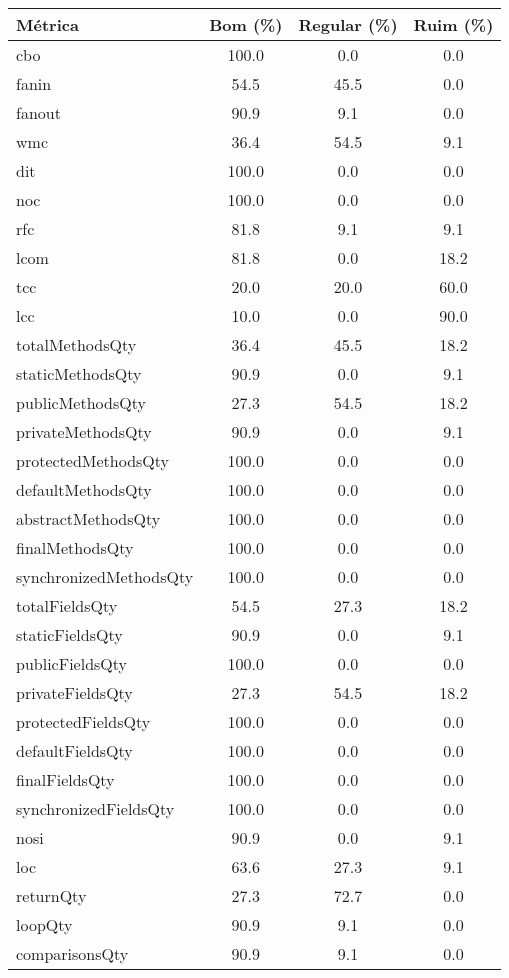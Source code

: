 \begin{tabular}{lccc}
                \toprule
                \textbf{Métrica} & \textbf{Bom (\%)} & \textbf{Regular (\%)} & \textbf{Ruim (\%)} \\
                \midrule
                cbo & 100.0 & 0.0 & 0.0 \\
fanin & 54.5 & 45.5 & 0.0 \\
fanout & 90.9 & 9.1 & 0.0 \\
wmc & 36.4 & 54.5 & 9.1 \\
dit & 100.0 & 0.0 & 0.0 \\
noc & 100.0 & 0.0 & 0.0 \\
rfc & 81.8 & 9.1 & 9.1 \\
lcom & 81.8 & 0.0 & 18.2 \\
tcc & 20.0 & 20.0 & 60.0 \\
lcc & 10.0 & 0.0 & 90.0 \\
totalMethodsQty & 36.4 & 45.5 & 18.2 \\
staticMethodsQty & 90.9 & 0.0 & 9.1 \\
publicMethodsQty & 27.3 & 54.5 & 18.2 \\
privateMethodsQty & 90.9 & 0.0 & 9.1 \\
protectedMethodsQty & 100.0 & 0.0 & 0.0 \\
defaultMethodsQty & 100.0 & 0.0 & 0.0 \\
abstractMethodsQty & 100.0 & 0.0 & 0.0 \\
finalMethodsQty & 100.0 & 0.0 & 0.0 \\
synchronizedMethodsQty & 100.0 & 0.0 & 0.0 \\
totalFieldsQty & 54.5 & 27.3 & 18.2 \\
staticFieldsQty & 90.9 & 0.0 & 9.1 \\
publicFieldsQty & 100.0 & 0.0 & 0.0 \\
privateFieldsQty & 27.3 & 54.5 & 18.2 \\
protectedFieldsQty & 100.0 & 0.0 & 0.0 \\
defaultFieldsQty & 100.0 & 0.0 & 0.0 \\
finalFieldsQty & 100.0 & 0.0 & 0.0 \\
synchronizedFieldsQty & 100.0 & 0.0 & 0.0 \\
nosi & 90.9 & 0.0 & 9.1 \\
loc & 63.6 & 27.3 & 9.1 \\
returnQty & 27.3 & 72.7 & 0.0 \\
loopQty & 90.9 & 9.1 & 0.0 \\
comparisonsQty & 90.9 & 9.1 & 0.0 \\

\end{tabular}
